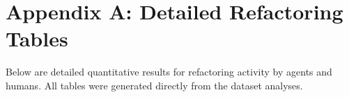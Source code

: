 \documentclass[11pt]{article}
\begin{document}
\section*{Appendix A: Detailed Refactoring Tables}

Below are detailed quantitative results for refactoring activity by agents and humans.
All tables were generated directly from the dataset analyses.


\end{document}
